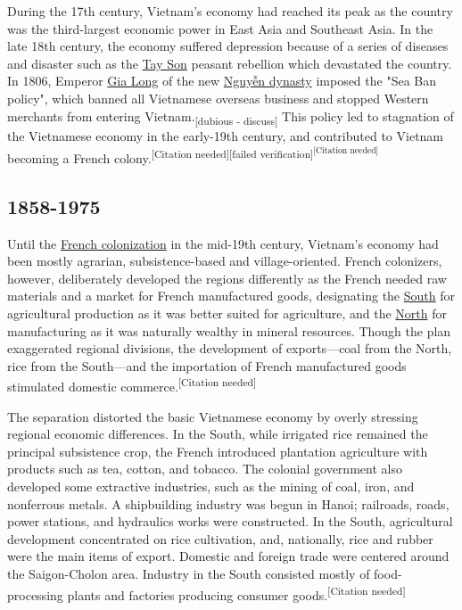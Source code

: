 \documentclass{article}
\begin{document}
During the 17th century, Vietnam's economy had reached its peak as the country was the third-largest economic power in East Asia and Southeast Asia. In the late 18th century, the economy suffered depression because of a series of diseases and disaster such as the \href{https://en.wikipedia.org/wiki/Tay_Son}{Tay Son} peasant rebellion which devastated the country. In 1806, Emperor \href{https://en.wikipedia.org/wiki/Gia_Long}{Gia Long} of the new \href{https://en.wikipedia.org/wiki/Nguy%E1%BB%85n_dynasty}{Nguyễn dynasty} imposed the "Sea Ban policy", which banned all Vietnamese overseas business and stopped Western merchants from entering Vietnam.\textsubscript{[dubious - discuss]} This policy led to stagnation of the Vietnamese economy in the early-19th century, and contributed to Vietnam becoming a French colony.\textsuperscript{[Citation needed][failed verification]\textsuperscript{[Citation needed]}}
\subsection*{1858-1975}

Until the \href{https://en.wikipedia.org/wiki/French_Indochina}{French colonization} in the mid-19th century, Vietnam's economy had been mostly agrarian, subsistence-based and village-oriented. French colonizers, however, deliberately developed the regions differently as the French needed raw materials and a market for French manufactured goods, designating the \href{https://en.wikipedia.org/wiki/Cochinchina}{South} for agricultural production as it was better suited for agriculture, and the \href{https://en.wikipedia.org/wiki/Tonkin}{North} for manufacturing as it was naturally wealthy in mineral resources. Though the plan exaggerated regional divisions, the development of exports—coal from the North, rice from the South—and the importation of French manufactured goods stimulated domestic commerce.\textsuperscript{[Citation needed]}

The separation distorted the basic Vietnamese economy by overly stressing regional economic differences. In the South, while irrigated rice remained the principal subsistence crop, the French introduced plantation agriculture with products such as tea, cotton, and tobacco. The colonial government also developed some extractive industries, such as the mining of coal, iron, and nonferrous metals. A shipbuilding industry was begun in Hanoi; railroads, roads, power stations, and hydraulics works were constructed. In the South, agricultural development concentrated on rice cultivation, and, nationally, rice and rubber were the main items of export. Domestic and foreign trade were centered around the Saigon-Cholon area. Industry in the South consisted mostly of food-processing plants and factories producing consumer goods.\textsuperscript{[Citation needed]}
\end{document}
